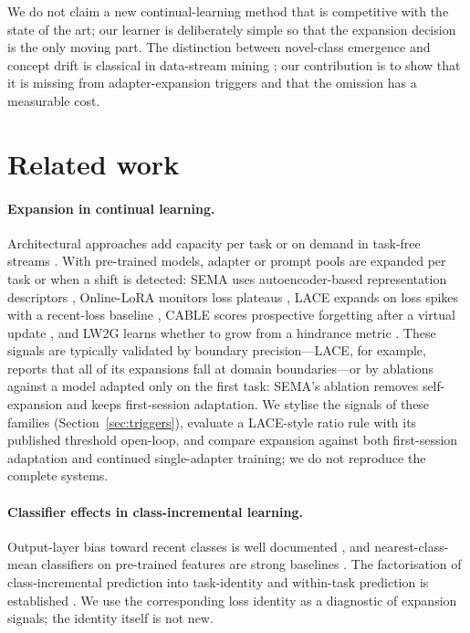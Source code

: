 \documentclass[10pt]{article}
\begin{document}
We do not claim a new continual-learning method that is competitive with the state of the art; our learner is deliberately simple so that the expansion decision is the only moving part. The distinction between novel-class emergence and concept drift is classical in data-stream mining \citep{masud2011novel}; our contribution is to show that it is missing from adapter-expansion triggers and that the omission has a measurable cost.

\section{Related work}

\paragraph{Expansion in continual learning.} Architectural approaches add capacity per task \citep{rusu2016pnn,yoon2018den} or on demand in task-free streams \citep{lee2020cndpm,ye2023sedem}. With pre-trained models, adapter or prompt pools are expanded per task \citep{zhou2024ease} or when a shift is detected: SEMA uses autoencoder-based representation descriptors \citep{wang2025sema}, Online-LoRA monitors loss plateaus \citep{wei2025onlinelora}, LACE expands on loss spikes with a recent-loss baseline \citep{tathe2026lace}, CABLE scores prospective forgetting after a virtual update \citep{julian2025cable}, and LW2G learns whether to grow from a hindrance metric \citep{feng2024lw2g}. These signals are typically validated by boundary precision---LACE, for example, reports that all of its expansions fall at domain boundaries---or by ablations against a model adapted only on the first task: SEMA's ablation removes self-expansion and keeps first-session adaptation. We stylise the signals of these families (Section~\ref{sec:triggers}), evaluate a LACE-style ratio rule with its published threshold open-loop, and compare expansion against both first-session adaptation and continued single-adapter training; we do not reproduce the complete systems.

\paragraph{Classifier effects in class-incremental learning.} Output-layer bias toward recent classes is well documented \citep{wu2019bic,hou2019lucir,caccia2022ace}, and nearest-class-mean classifiers on pre-trained features are strong baselines \citep{rebuffi2017icarl,mai2021scr,zhou2024aper,mcdonnell2023ranpac}. The factorisation of class-incremental prediction into task-identity and within-task prediction is established \citep{kim2022theoretical}. We use the corresponding loss identity as a diagnostic of expansion signals; the identity itself is not new.
\end{document}
